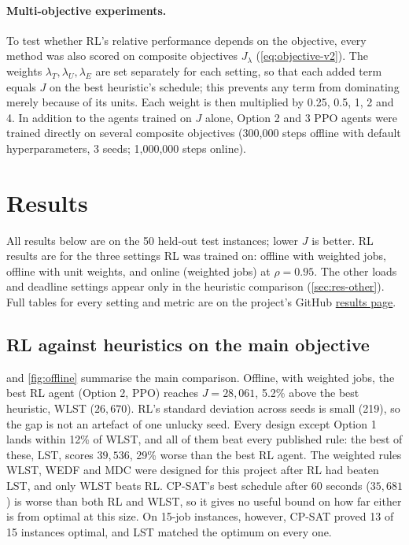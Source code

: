 \documentclass[12pt]{article}
\begin{document}
\paragraph{Multi-objective experiments.}\label{sec:mo-method} To test whether RL's relative performance depends on the objective, every method was also scored on composite objectives $J_\lambda$ (\cref{eq:objective-v2}). The weights $\lambda_T, \lambda_U, \lambda_E$ are set separately for each setting, so that each added term equals $J$ on the best heuristic's schedule; this prevents any term from dominating merely because of its units. Each weight is then multiplied by 0.25, 0.5, 1, 2 and 4. In addition to the agents trained on $J$ alone, Option 2 and 3 PPO agents were trained directly on several composite objectives (300,000 steps offline with default hyperparameters, 3 seeds; 1,000,000 steps online).

\section{Results}\label{sec:results}
All results below are on the 50 held-out test instances; lower $J$ is better. RL results are for the three settings RL was trained on: offline with weighted jobs, offline with unit weights, and online (weighted jobs) at $\rho = 0.95$. The other loads and deadline settings appear only in the heuristic comparison (\cref{sec:res-other}). Full tables for every setting and metric are on the project's GitHub \href{https://github.com/Ethan-Ty-Riekert/Neural-Knapsack-Research-Project/tree/main/Results}{results page}.

\subsection{RL against heuristics on the main objective}\label{sec:res-main}
 and \cref{fig:offline} summarise the main comparison. Offline, with weighted jobs, the best RL agent (Option 2, PPO) reaches $J = 28{,}061$, 5.2\% above the best heuristic, WLST ($26{,}670$). RL's standard deviation across seeds is small (219), so the gap is not an artefact of one unlucky seed. Every design except Option 1 lands within 12\% of WLST, and all of them beat every published rule: the best of these, LST, scores $39{,}536$, 29\% worse than the best RL agent. The weighted rules WLST, WEDF and MDC were designed for this project after RL had beaten LST, and only WLST beats RL. CP-SAT's best schedule after 60 seconds ($35{,}681$) is worse than both RL and WLST, so it gives no useful bound on how far either is from optimal at this size. On 15-job instances, however, CP-SAT proved 13 of 15 instances optimal, and LST matched the optimum on every one.
\end{document}
